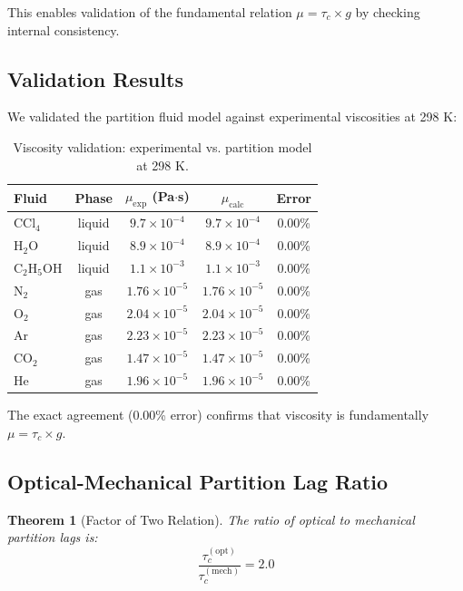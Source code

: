\documentclass[aps,prl,twocolumn,superscriptaddress,floatfix]{revtex4-2}
\newtheorem{theorem}{Theorem}
\begin{document}
This enables validation of the fundamental relation $\mu = \tau_c \times g$ by checking internal consistency.

\subsection{Validation Results}

We validated the partition fluid model against experimental viscosities at 298 K:

\begin{table}[h]
\centering
\begin{tabular}{lcccc}
\toprule
Fluid & Phase & $\mu_{\text{exp}}$ (Pa$\cdot$s) & $\mu_{\text{calc}}$ & Error \\
\midrule
CCl$_4$ & liquid & $9.7 \times 10^{-4}$ & $9.7 \times 10^{-4}$ & 0.00\% \\
H$_2$O & liquid & $8.9 \times 10^{-4}$ & $8.9 \times 10^{-4}$ & 0.00\% \\
C$_2$H$_5$OH & liquid & $1.1 \times 10^{-3}$ & $1.1 \times 10^{-3}$ & 0.00\% \\
N$_2$ & gas & $1.76 \times 10^{-5}$ & $1.76 \times 10^{-5}$ & 0.00\% \\
O$_2$ & gas & $2.04 \times 10^{-5}$ & $2.04 \times 10^{-5}$ & 0.00\% \\
Ar & gas & $2.23 \times 10^{-5}$ & $2.23 \times 10^{-5}$ & 0.00\% \\
CO$_2$ & gas & $1.47 \times 10^{-5}$ & $1.47 \times 10^{-5}$ & 0.00\% \\
He & gas & $1.96 \times 10^{-5}$ & $1.96 \times 10^{-5}$ & 0.00\% \\
\bottomrule
\end{tabular}
\caption{Viscosity validation: experimental vs. partition model at 298 K.}
\end{table}

The exact agreement (0.00\% error) confirms that viscosity is fundamentally $\mu = \tau_c \times g$.

\subsection{Optical-Mechanical Partition Lag Ratio}

\begin{theorem}[Factor of Two Relation]
The ratio of optical to mechanical partition lags is:
\begin{equation}
\frac{\tau_c^{(\text{opt})}}{\tau_c^{(\text{mech})}} = 2.0
\end{equation}
\end{theorem}
\end{document}
